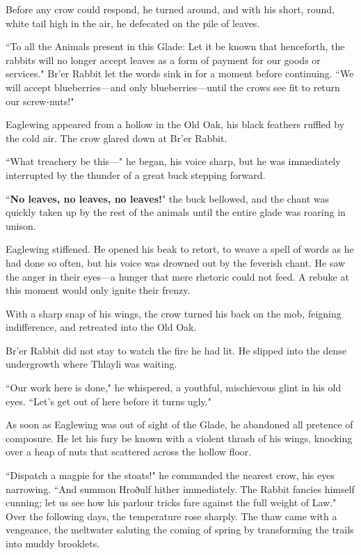 Before any crow could respond, he turned around, and with his short, round, white tail high in the air, he defecated on the pile of leaves.

``To all the Animals present in this Glade: Let it be known that henceforth, the rabbits will no longer accept leaves as a form of payment for our goods or services."
Br'er Rabbit let the words sink in for a moment before continuing.
``We will accept blueberries---and only blueberries---until the crows see fit to return our screw-nuts!"

Eaglewing appeared from a hollow in the Old Oak, his black feathers ruffled by the cold air.
The crow glared down at Br'er Rabbit.

``What treachery be this---" he began, his voice sharp, but he was immediately interrupted by the thunder of a great buck stepping forward.

``\textbf{No leaves, no leaves, no leaves!}" the buck bellowed, and the chant was quickly taken up by the rest of the animals until the entire glade was roaring in unison.

Eaglewing stiffened.
He opened his beak to retort, to weave a spell of words as he had done so often, but his voice was drowned out by the feverish chant.
He saw the anger in their eyes---a hunger that mere rhetoric could not feed.
A rebuke at this moment would only ignite their frenzy.

With a sharp snap of his wings, the crow turned his back on the mob, feigning indifference, and retreated into the Old Oak.

Br'er Rabbit did not stay to watch the fire he had lit.
He slipped into the dense undergrowth where Thlayli was waiting.

``Our work here is done," he whispered, a youthful, mischievous glint in his old eyes.
``Let's get out of here before it turns ugly."

As soon as Eaglewing was out of sight of the Glade, he abandoned all pretence of composure.
He let his fury be known with a violent thrash of his wings, knocking over a heap of nuts that scattered across the hollow floor.

``Dispatch a magpie for the stoats!" he commanded the nearest crow, his eyes narrowing.
``And summon Hroðulf hither immediately.
The Rabbit fancies himself cunning; let us see how his parlour tricks fare against the full weight of Law."\\

Over the following days, the temperature rose sharply.
The thaw came with a vengeance, the meltwater saluting the coming of spring by transforming the trails into muddy brooklets.

